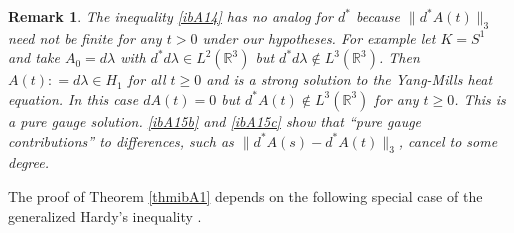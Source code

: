 \documentclass[12pt]{article}
\newtheorem{remark}[theorem]{Remark}
\def \l{\lambda}
\def \R{\mathbb R}
\def \eref{\eqref}
\numberwithin{equation}{section}
\begin{document}
       \begin{remark}
{\rm  The inequality \eref{ibA14} has no analog for $d^*$ because $\|d^* A(t)\|_3$
need not be finite for any $t >0$ under our hypotheses. 
For example let $K = S^1$ and take $A_0 = d\lambda$ with $d^*d\l \in L^2(\R^3)$
but $d^*d \l \notin L^3(\R^3)$. 
    Then  $A(t): = d\l \in H_1$ for all $t \ge 0$ and  is a strong solution to the Yang-Mills heat equation. 
In this case $dA(t) =0$ but  $d^*A(t) \notin L^3(\R^3)$ for any $t\ge 0$. This is a pure gauge solution.
\eref{ibA15b} and \eref{ibA15c} show that ``pure gauge contributions'' to 
 differences, such as $\|d^* A(s) - d^*A(t)\|_3$,   cancel  to some degree.
 }
\end{remark}


\bigskip
The proof of Theorem \ref{thmibA1} depends on  the following  special case of  the
 generalized Hardy's inequality \cite[Theorem 6.1.4]{SiPt3}.
\end{document}
